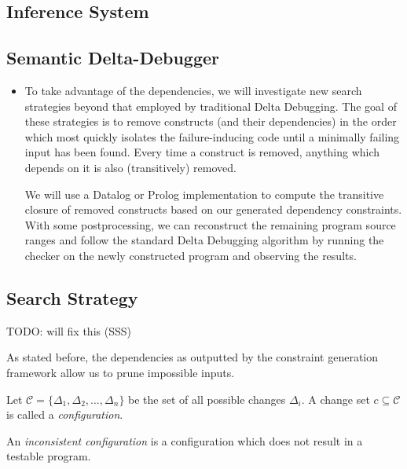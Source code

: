 \documentclass[preprint]{acm_proc_article-sp}
\newenvironment{definition}[1][Definition]{\begin{trivlist}
\item[\hskip \labelsep {\bfseries #1}]}{\end{trivlist}}
\begin{document}
\subsection{Inference System}

\subsection{Semantic Delta-Debugger}

\begin{itemize}

\item To take advantage of the dependencies, we will investigate new search
  strategies beyond that employed by traditional Delta Debugging.  The goal of
  these strategies is to remove constructs (and their dependencies) in the order
  which most quickly isolates the failure-inducing code until a minimally
  failing input has been found.  Every time a construct is removed, anything
  which depends on it is also (transitively) removed.

  We will use a Datalog or Prolog implementation to compute the transitive
  closure of removed constructs based on our generated dependency constraints.
  With some postprocessing, we can reconstruct the remaining program source
  ranges and follow the standard Delta Debugging algorithm by running the
  checker on the newly constructed program and observing the results.

\end{itemize}

\subsection{Search Strategy}
TODO: will fix this (SSS)

As stated before, the dependencies as outputted by the constraint generation
framework allow us to prune impossible inputs.

\begin{definition}
Let $\mathcal{C} = \{ \Delta_1, \Delta_2, \ldots, \Delta_n \}$ be the set of all
possible changes $\Delta_i$. A change set $c \subseteq \mathcal{C}$ is called a
\emph{configuration}.
\end{definition}

\begin{definition}
An \emph{inconsistent configuration} is a configuration which does not result in
a testable program.
\end{definition}
\end{document}
